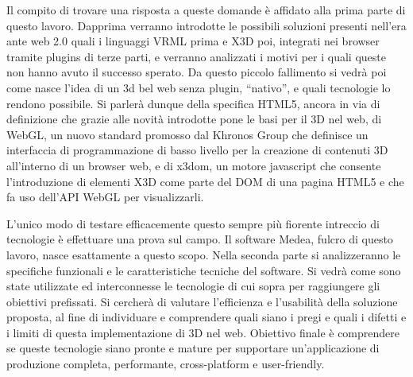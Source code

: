 Il compito di trovare una risposta a queste domande è affidato alla prima parte di questo lavoro. Dapprima verranno introdotte le possibili soluzioni presenti nell'era ante web 2.0 quali i linguaggi VRML prima e X3D poi, integrati nei browser tramite plugins di terze parti, e verranno analizzati i motivi per i quali queste non hanno avuto il successo sperato. Da questo piccolo fallimento si vedrà poi come nasce l'idea di un 3d bel web senza plugin, “nativo”, e quali tecnologie lo rendono possibile. Si parlerà dunque della specifica HTML5, ancora in via di definizione che grazie alle novità introdotte pone le basi per il 3D nel web, di WebGL, un nuovo standard promosso dal Khronos Group che definisce un interfaccia di programmazione di basso livello per la creazione di contenuti 3D all'interno di un browser web, e di x3dom, un motore javascript che consente l'introduzione di elementi X3D come parte del DOM di una pagina HTML5 e che fa uso dell'API WebGL per visualizzarli.

L'unico modo di testare efficacemente questo sempre più fiorente intreccio di tecnologie è effettuare una prova sul campo. Il software Medea, fulcro di questo lavoro, nasce esattamente a questo scopo. Nella seconda parte si analizzeranno le specifiche funzionali e le caratteristiche tecniche del software. Si vedrà come sono state utilizzate ed interconnesse le tecnologie di cui sopra per raggiungere gli obiettivi prefissati. Si cercherà di valutare l'efficienza e l'usabilità della soluzione proposta, al fine di individuare e comprendere quali siano i pregi e quali i difetti e i limiti di questa implementazione di 3D nel web. Obiettivo finale è comprendere se queste tecnologie siano pronte e mature per supportare un'applicazione di produzione completa, performante, cross-platform e user-friendly.
